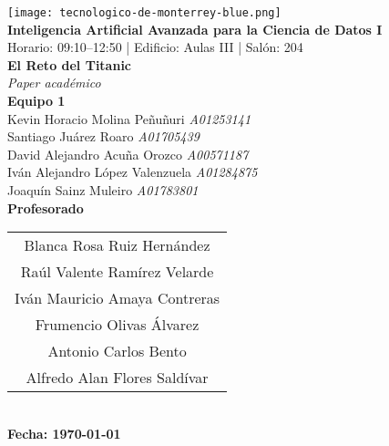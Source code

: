 \documentclass[conference]{IEEEtran}
\begin{document}
\begin{titlepage}
    \thispagestyle{empty}
    \centering
    \vspace*{0.5cm}

    \texttt{[image: tecnologico-de-monterrey-blue.png]}\\[0.8cm]

    
    {\large \bfseries Inteligencia Artificial Avanzada para la Ciencia de Datos I}\\[0.3cm]
    {\normalsize Horario: 09:10–12:50 \quad | \quad Edificio: Aulas III \quad | \quad Salón: 204}\\[0.8cm]

    \vspace{1cm}
    {\huge \bfseries El Reto del Titanic}\\[0.3cm]
    {\large \itshape Paper académico}\\[1.2cm]

    {\large \bfseries Equipo 1}\\[0.4cm]
    {\large
    Kevin Horacio Molina Peñuñuri \textit{A01253141}\\
    Santiago Juárez Roaro \textit{A01705439}\\
    David Alejandro Acuña Orozco \textit{A00571187}\\
    Iván Alejandro López Valenzuela \textit{A01284875}\\
    Joaquín Sainz Muleiro \textit{A01783801}
    }\\[1.2cm]

    {\large \bfseries Profesorado}\\[0.6cm]
    {\normalsize
    \begin{tabular}{@{}c@{}}
    Blanca Rosa Ruiz Hernández \\[0.2cm]
    Raúl Valente Ramírez Velarde \\[0.2cm]
    Iván Mauricio Amaya Contreras \\[0.2cm]
    Frumencio Olivas Álvarez \\[0.2cm]
    Antonio Carlos Bento \\[0.2cm]
    Alfredo Alan Flores Saldívar
    \end{tabular}
    }\\[1.2cm]

    {\large \bfseries Fecha: \today}\\[0.8cm]

    \vfill
\end{titlepage}
\end{document}

